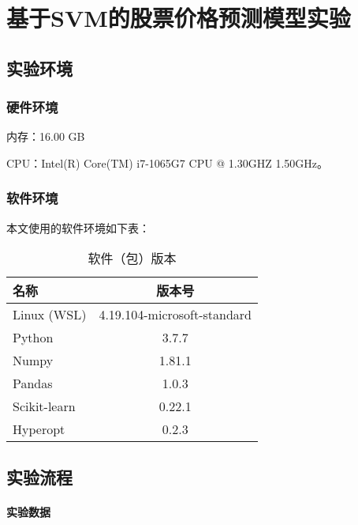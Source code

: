 \chapter{基于SVM的股票价格预测模型实验}

\section{实验环境}

\subsection{硬件环境}

内存：16.00 GB

CPU：Intel(R) Core(TM) i7-1065G7 CPU @ 1.30GHZ 1.50GHz。

\subsection{软件环境}
本文使用的软件环境如下表：
\begin{table}[ht]
    \centering
    \caption{软件（包）版本}
    \begin{tabular}{lc}
        \hline
        {名称} & {版本号}\\
        \hline
        {Linux (WSL)} & {4.19.104-microsoft-standard}\\
        {Python} & {3.7.7}\\
        {Numpy} & {1.81.1}\\
        {Pandas} & {1.0.3}\\
        {Scikit-learn} & {0.22.1}\\
        {Hyperopt} & {0.2.3}
    \end{tabular}
\end{table}

\section{实验流程}

\subsubsection{实验数据}

